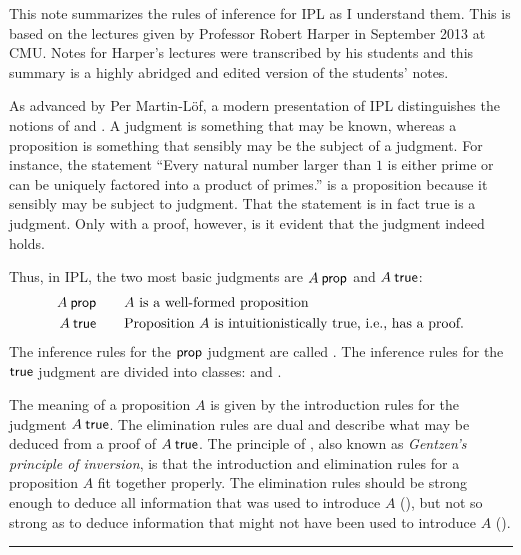 \documentclass{article}
\begin{document}
This note summarizes the rules of inference for \ac{IPL} as I understand them.
This is based on the lectures given by Professor Robert Harper in September
2013 at CMU. Notes for Harper's lectures were transcribed by his students and
this summary is a highly abridged and edited version of the students' notes. 

As advanced by Per Martin-L\"{o}f, a modern presentation of \ac{IPL}
distinguishes the notions of  and . A
judgment is something that may be known, whereas a proposition is something that
sensibly may be the subject of a judgment. For instance, the statement ``Every
natural number larger than $1$ is either prime or can be uniquely factored into
a product of primes\@.'' is a proposition because it sensibly may be subject to
judgment. That the statement is in fact true is a judgment.
Only with a proof, however, is it evident that the judgment indeed holds.

Thus, in \ac{IPL}, the two most basic judgments are $A \prop$ and $A \true$:
\begin{alignat*}{2}
  A \prop &&\quad& \text{$A$ is a well-formed proposition} \\
  A \true &&& \text{\begin{tabular}[t]{@{}l@{}}
                Proposition $A$ is intuitionistically true, i.e., has a proof.
              \end{tabular}}
\end{alignat*}
The inference rules for the $\prop$ judgment are called .
The inference rules for the $\true$ judgment are divided into classes:
 and . 

The meaning of a proposition $A$ is given by the introduction rules for the
judgment $A \true$. The elimination rules are dual and  describe what may be
deduced from a proof of $A \true$.  The principle of ,
also known as \emph{Gentzen's principle of inversion}, is that the introduction
and elimination rules for a proposition $A$ fit together properly.  The
elimination rules should be strong enough to deduce all information that was
used to introduce $A$ (), but not so strong as to
deduce information that might not have been used to introduce $A$ (). 

\medskip 

\hrule
\end{document}
